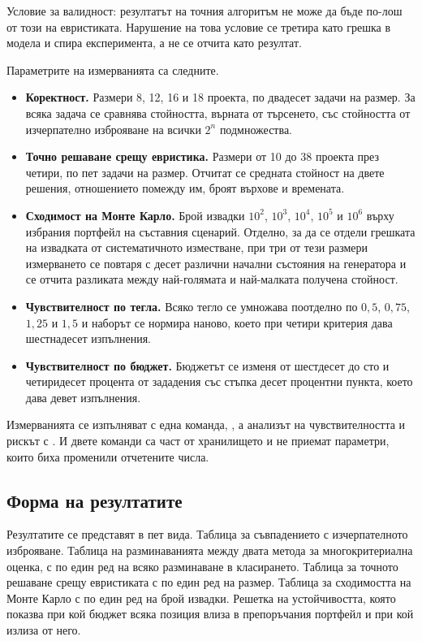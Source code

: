 Условие за валидност: резултатът на точния алгоритъм не може да бъде по-лош от
този на евристиката. Нарушение на това условие се третира като грешка в модела и
спира експеримента, а не се отчита като резултат.

Параметрите на измерванията са следните.

\begin{itemize}[topsep=0pt,itemsep=0pt,leftmargin=*]
\item \textbf{Коректност.} Размери 8, 12, 16 и 18 проекта, по двадесет задачи на
      размер. За всяка задача се сравнява стойността, върната от търсенето, със
      стойността от изчерпателно изброяване на всички $2^n$ подмножества.
\item \textbf{Точно решаване срещу евристика.} Размери от 10 до 38 проекта през
      четири, по пет задачи на размер. Отчитат се средната стойност на двете
      решения, отношението помежду им, броят върхове и времената.
\item \textbf{Сходимост на Монте Карло.} Брой извадки $10^2$, $10^3$, $10^4$,
      $10^5$ и $10^6$ върху избрания портфейл на съставния сценарий. Отделно, за
      да се отдели грешката на извадката от систематичното изместване, при три
      от тези размери измерването се повтаря с десет различни начални състояния
      на генератора и се отчита разликата между най-голямата и най-малката
      получена стойност.
\item \textbf{Чувствителност по тегла.} Всяко тегло се умножава поотделно по
      $0{,}5$, $0{,}75$, $1{,}25$ и $1{,}5$ и наборът се нормира наново, което
      при четири критерия дава шестнадесет изпълнения.
\item \textbf{Чувствителност по бюджет.} Бюджетът се изменя от шестдесет до сто
      и четиридесет процента от зададения със стъпка десет процентни пункта,
      което дава девет изпълнения.
\end{itemize}

Измерванията се изпълняват с една команда, , а анализът на
чувствителността и рискът с . И двете команди са част от
хранилището и не приемат параметри, които биха променили отчетените числа.

\subsection{Форма на резултатите}

Резултатите се представят в пет вида. Таблица за съвпадението с изчерпателното
изброяване. Таблица на разминаванията между двата метода за многокритериална
оценка, с по един ред на всяко разминаване в класирането. Таблица за точното
решаване срещу евристиката с по един ред на размер. Таблица за сходимостта на
Монте Карло с по един ред на брой извадки. Решетка на устойчивостта, която
показва при кой бюджет всяка позиция влиза в препоръчания портфейл и при кой
излиза от него.
